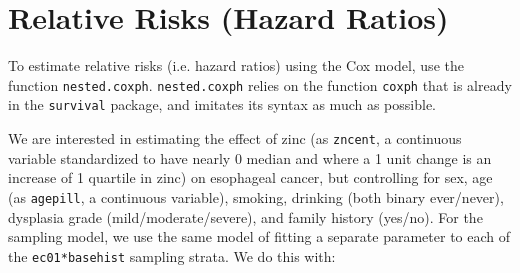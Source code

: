 \documentclass[10pt]{article}
\begin{document}
\section{Relative Risks (Hazard Ratios)}
\label{sec:relat-risks-hazard}

To estimate relative risks (i.e. hazard ratios) using the Cox model, use the function
\texttt{nested.coxph}.  \texttt{nested.coxph} relies on the function \texttt{coxph} that
is already in the \texttt{survival} package, and imitates its syntax as much as possible.

We are interested in estimating the effect of zinc (as \texttt{zncent}, a continuous
variable standardized to have nearly 0 median and where a 1 unit change is an increase of
1 quartile in zinc) on esophageal cancer, but controlling for sex, age (as
\texttt{agepill}, a continuous variable), smoking, drinking (both binary ever/never),
dysplasia grade (mild/moderate/severe), and family history (yes/no).  For the sampling
model, we use the same model of fitting a separate parameter to each of the
\texttt{ec01*basehist} sampling strata.  We do this with:
\end{document}
